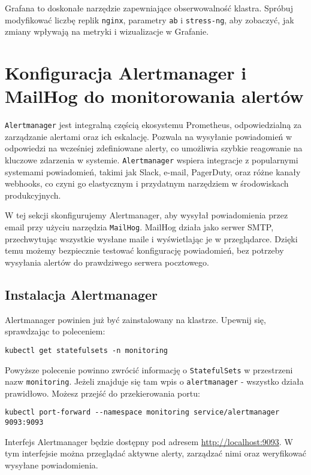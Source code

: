 \documentclass{article}
\begin{document}
Grafana to doskonałe narzędzie zapewniające obserwowalność klastra. Spróbuj modyfikować liczbę replik \texttt{nginx}, parametry \texttt{ab} i \texttt{stress-ng}, aby zobaczyć, jak zmiany wpływają na metryki i wizualizacje w Grafanie.

\section{Konfiguracja Alertmanager i MailHog do monitorowania alertów}

\texttt{Alertmanager} jest integralną częścią ekosystemu Prometheus, odpowiedzialną za zarządzanie alertami oraz ich eskalację. Pozwala na wysyłanie powiadomień w odpowiedzi na wcześniej zdefiniowane alerty, co umożliwia szybkie reagowanie na kluczowe zdarzenia w systemie. \texttt{Alertmanager} wspiera integracje z popularnymi systemami powiadomień, takimi jak Slack, e-mail, PagerDuty, oraz różne kanały webhooks, co czyni go elastycznym i przydatnym narzędziem w środowiskach produkcyjnych.

W tej sekcji skonfigurujemy Alertmanager, aby wysyłał powiadomienia przez email przy użyciu narzędzia \texttt{MailHog}. MailHog działa jako serwer SMTP, przechwytując wszystkie wysłane maile i wyświetlając je w przeglądarce. Dzięki temu możemy bezpiecznie testować konfigurację powiadomień, bez potrzeby wysyłania alertów do prawdziwego serwera pocztowego.

\subsection{Instalacja Alertmanager}
Alertmanager powinien już być zainstalowany na klastrze. Upewnij się, sprawdzając to poleceniem:
\begin{lstlisting}
kubectl get statefulsets -n monitoring
\end{lstlisting}
Powyższe polecenie powinno zwrócić informację o \texttt{StatefulSets} w przestrzeni nazw \texttt{monitoring}. Jeżeli znajduje się tam wpis o \texttt{alertmanager} - wszystko działa prawidłowo. Możesz przejść do przekierowania portu:
\begin{lstlisting}
kubectl port-forward --namespace monitoring service/alertmanager 9093:9093
\end{lstlisting}

Interfejs Alertmanager będzie dostępny pod adresem \url{http://localhost:9093}. W tym interfejsie można przeglądać aktywne alerty, zarządzać nimi oraz weryfikować wysyłane powiadomienia.
\end{document}
